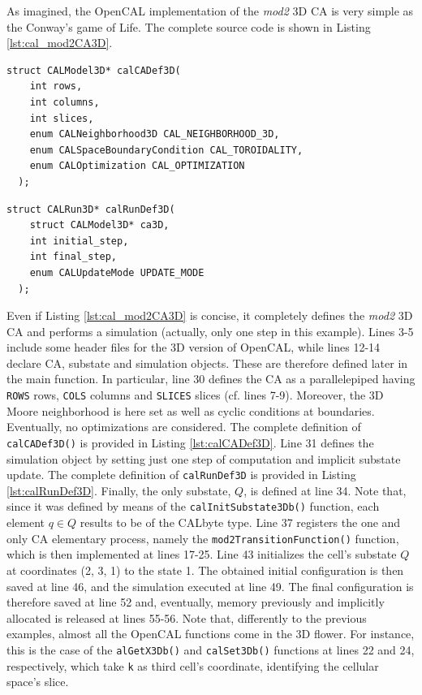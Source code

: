 As imagined, the OpenCAL implementation of the \emph{mod2} 3D
CA is very simple as the Conway's game of Life. The complete
source code is shown in Listing \ref{lst:cal_mod2CA3D}.



\begin{lstlisting}[float, label=lst:calCADef3D, caption=Definition of the calCADef3D() function., numbers=none]
  struct CALModel3D* calCADef3D(
    int rows,
    int columns,
    int slices,
    enum CALNeighborhood3D CAL_NEIGHBORHOOD_3D,
    enum CALSpaceBoundaryCondition CAL_TOROIDALITY,
    enum CALOptimization CAL_OPTIMIZATION
  );
\end{lstlisting}

\begin{lstlisting}[float, label=lst:calRunDef3D, caption=Definition of the calRunDef3D() function., numbers=none]
  struct CALRun3D* calRunDef3D(
    struct CALModel3D* ca3D,
    int initial_step,
    int final_step,
    enum CALUpdateMode UPDATE_MODE
  );	
\end{lstlisting}

Even if Listing \ref{lst:cal_mod2CA3D} is concise, it completely
defines the \emph{mod2} 3D CA and performs a simulation (actually,
only one step in this example). Lines 3-5 include some header files
for the 3D version of OpenCAL, while lines 12-14 declare CA, substate
and simulation objects. These are therefore defined later in the main
function. In particular, line 30 defines the CA as a parallelepiped
having \verb'ROWS' rows, \verb'COLS' columns and \verb'SLICES' slices
(cf. lines 7-9). Moreover, the 3D Moore neighborhood is here set as
well as cyclic conditions at boundaries. Eventually, no optimizations
are considered. The complete definition of \verb'calCADef3D()' is
provided in Listing \ref{lst:calCADef3D}. Line 31 defines the
simulation object by setting just one step of computation and implicit
substate update. The complete definition of \verb'calRunDef3D' is
provided in Listing \ref{lst:calRunDef3D}. Finally, the only substate,
$Q$, is defined at line 34. Note that, since it was defined by means
of the \verb'calInitSubstate3Db()' function, each element $q \in Q$
results to be of the CALbyte type. Line 37 registers the one and only
CA elementary process, namely the \verb'mod2TransitionFunction()'
function, which is then implemented at lines 17-25. Line 43
initializes the cell's substate $Q$ at coordinates (2, 3, 1) to the
state 1. The obtained initial configuration is then saved at line 46,
and the simulation executed at line 49. The final configuration is
therefore saved at line 52 and, eventually, memory previously and
implicitly allocated is released at lines 55-56. Note that,
differently to the previous examples, almost all the OpenCAL functions
come in the 3D flower. For instance, this is the case of the
\verb'alGetX3Db()' and \verb'calSet3Db()' functions at lines 22 and
24, respectively, which take \verb'k' as third cell's coordinate,
identifying the cellular space's slice.

